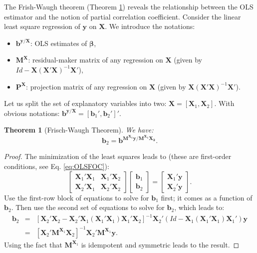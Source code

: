 \documentclass[
  12pt,
]{book}
\providecommand{\tightlist}{%
  \setlength{\itemsep}{0pt}\setlength{\parskip}{0pt}}
\newtheorem{theorem}{Theorem}[chapter]
\theoremstyle{definition}
\theoremstyle{definition}
\theoremstyle{definition}
\theoremstyle{definition}
\theoremstyle{remark}
\begin{document}
The Frish-Waugh theorem (Theorem \ref{thm:FW}) reveals the relationship between the OLS estimator and the notion of partial correlation coefficient. Consider the linear least square regression of \(\mathbf{y}\) on \(\mathbf{X}\). We introduce the notations:

\begin{itemize}
\tightlist
\item
  \(\mathbf{b}^{\mathbf{y}/\mathbf{X}}\): OLS estimates of \(\boldsymbol\beta\),
\item
  \(\mathbf{M}^{\mathbf{X}}\): residual-maker matrix of any regression on \(\mathbf{X}\) (given by \(Id - \mathbf{X} (\mathbf{X}'\mathbf{X})^{-1} \mathbf{X}'\)),
\item
  \(\mathbf{P}^{\mathbf{X}}\): projection matrix of any regression on \(\mathbf{X}\) (given by \(\mathbf{X} (\mathbf{X}'\mathbf{X})^{-1} \mathbf{X}'\)).
\end{itemize}

Let us split the set of explanatory variables into two: \(\mathbf{X} = [\mathbf{X}_1,\mathbf{X}_2]\). With obvious notations: \(\mathbf{b}^{\mathbf{y}/\mathbf{X}}=[\mathbf{b}_1',\mathbf{b}_2']'\).

\begin{theorem}[Frisch-Waugh Theorem]
\protect\hypertarget{thm:FW}{}\label{thm:FW}We have:
\[
\mathbf{b}_2 = \mathbf{b}^{\mathbf{M^{\mathbf{X}_1}y}/\mathbf{M^{\mathbf{X}_1}\mathbf{X}_2}}.
\]
\end{theorem}

\begin{proof}
The minimization of the least squares leads to (these are first-order conditions, see Eq. \eqref{eq:OLSFOC}):
\[
\left[ \begin{array}{cc} \mathbf{X}_1'\mathbf{X}_1 & \mathbf{X}_1'\mathbf{X}_2 \\ \mathbf{X}_2'\mathbf{X}_1 & \mathbf{X}_2'\mathbf{X}_2\end{array}\right]
\left[ \begin{array}{c} \mathbf{b}_1 \\ \mathbf{b}_2\end{array}\right] =
\left[ \begin{array}{c} \mathbf{X}_1' \mathbf{y} \\ \mathbf{X}_2' \mathbf{y} \end{array}\right].
\]
Use the first-row block of equations to solve for \(\mathbf{b}_1\) first; it comes as a function of \(\mathbf{b}_2\). Then use the second set of equations to solve for \(\mathbf{b}_2\), which leads to:
\begin{eqnarray*}
\mathbf{b}_2 &=& [\mathbf{X}_2'\mathbf{X}_2 - \mathbf{X}_2'\mathbf{X}_1(\mathbf{X}_1'\mathbf{X}_1)\mathbf{X}_1'\mathbf{X}_2]^{-1}\mathbf{X}_2'(Id - \mathbf{X}_1(\mathbf{X}_1'\mathbf{X}_1)\mathbf{X}_1')\mathbf{y}\\
&=& [\mathbf{X}_2' \mathbf{M}^{\mathbf{X}_1}\mathbf{X}_2]^{-1}\mathbf{X}_2'\mathbf{M}^{\mathbf{X}_1}\mathbf{y}.
\end{eqnarray*}
Using the fact that \(\mathbf{M}^{\mathbf{X}_1}\) is idempotent and symmetric leads to the result.
\end{proof}
\end{document}
